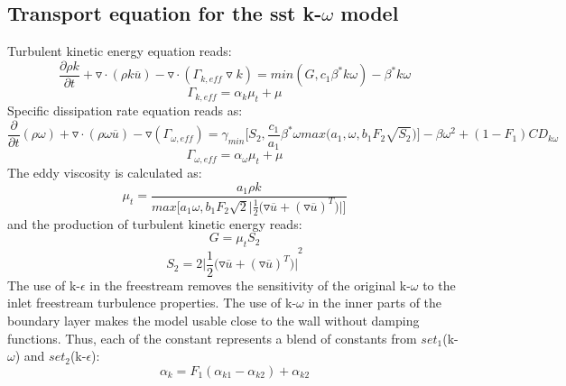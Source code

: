 \subsection{Transport equation for the sst k-$\omega$ model}
Turbulent kinetic energy equation reads:
\begin{equation}
{{{\frac{\partial {\rho k}}{\partial t}}+{\triangledown \cdot(\rho k \overline{u})}}-{\triangledown \cdot ({{\Gamma}_{k,eff}}\triangledown{k})}}={min(G,{c_1}{{\beta}^*}k\omega)-{{\beta}^*}k\omega}
\end{equation}
\begin{equation}
{{\Gamma}_{k,eff}}={{{\alpha}_k}{{\mu}_t}}+{\mu}
\end{equation}
Specific dissipation rate equation reads as:
\begin{equation}
{{{\frac{\partial}{\partial t}}(\rho \omega)}+{{\triangledown\cdot(\rho \omega \overline{u})}}-{\triangledown({{\Gamma}_{\omega,eff}})}}={{{\gamma}_{min}}\bigg[{S_2},{\frac{c_1}{a_1}}{{\beta}^*}\omega max\bigg
({a_1},{\omega},{b_1}{F_{2}\sqrt{S_2}\bigg)\bigg]}}-{{\beta}{{\omega}^2}+(1-{F_1})CD_{k\omega}}
\end{equation}
\begin{equation}
{{\Gamma}_{\omega,eff}}={{{\alpha}_{\omega}}{{\mu}_t}+{\mu}}
\end{equation}
The eddy viscosity is calculated as:
\begin{equation}
{{\mu}_t}={\frac{{a_1}\rho k}{max\bigg[{a_1}{\omega},{b_1}{F_2}\sqrt{2}\bigg\vert{{\frac{1}{2}\bigg({\triangledown \overline{u}}+{(\triangledown \overline{u})^{T}}\bigg)\bigg\vert }}\bigg]}}
\end{equation}
and the production of turbulent kinetic energy reads:
\begin{equation}
{G}={{\mu}_t}{S_2}
\end{equation}
\begin{equation}
{S_2}={2\bigg\vert{{\frac{1}{2}\bigg({\triangledown \overline{u}}+{(\triangledown \overline{u})^{T}}\bigg)\bigg\vert}^2}}
\end{equation}
The use of k-$\epsilon$ in the freestream removes the sensitivity of the original k-$\omega$ to the inlet freestream turbulence properties. The use of k-$\omega$ in the inner parts of the boundary layer 
makes the model usable close to the wall without damping functions. Thus, each of the constant represents a blend of constants from $set_1$(k-$\omega$) and $set_2$(k-$\epsilon$):
\begin{equation}
{{\alpha}_k}={F_1}({{\alpha}_{k1}}-{{\alpha}_{k2}})+{{\alpha}_{k2}}
\end{equation}

